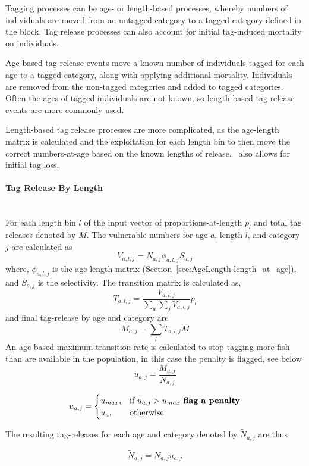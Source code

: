 Tagging processes can be age- or length-based processes, whereby numbers of individuals are moved from an untagged category to a tagged category defined in the  block. Tag release processes can also account for initial tag-induced mortality on individuals.

Age-based tag release events move a known number of individuals tagged for each age to a tagged category, along with applying additional mortality. Individuals are removed from the non-tagged categories and added to tagged categories. Often the ages of tagged individuals are not known, so length-based tag release events are more commonly used.

Length-based tag release processes are more complicated, as the age-length matrix is calculated and the exploitation for each length bin to then move the correct numbers-at-age based on the known lengths of release. \CNAME\ also allows for initial tag loss.

\paragraph*{{Tag Release By Length}}
\\

For each length bin $l$ of the input vector of proportions-at-length ${p}_l$ and total tag releases denoted by \(M\). The vulnerable numbers for age \(a\), length \(l\), and category \(j\) are calculated as
$$V_{a,l,j} = N_{a,j} \phi_{a,l,j} S_{a,j}$$
where, \(\phi_{a,l,j}\) is the age-length matrix (Section~\ref{sec:AgeLength-length_at_age}), and \(S_{a,j}\) is the selectivity. The transition matrix is calculated as,
$$ T_{a,l,j}= \frac{V_{a,l,j}}{\sum_a\sum_j V_{a,l,j}} {p}_l$$
and final tag-release by age and category are
$$ M_{a,j} = \sum_l T_{a,l,j}M  $$
An age based maximum transition rate is calculated to stop tagging more fish than are available in the population, in this case the penalty is flagged, see below
$$ u_{a,j} = \frac{ M_{a,j} }{N_{a,j} }  $$

$$
u_{a,j} =
\begin{cases}
u_{max},& \text{if } u_{a,j} > u_{max} \text{ \textbf{flag a penalty}}\\
u_{a},  & \text{otherwise}
\end{cases}
$$

The resulting tag-releases for each age and category denoted by \(\widetilde{N}_{a,j}\) are thus

$$
\widetilde{N}_{a,j} = N_{a,j} u_{a,j}
$$

